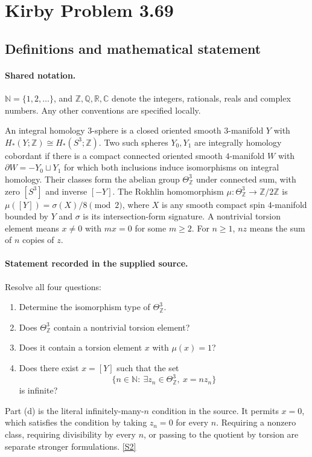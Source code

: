 \documentclass[11pt]{article}
\newcommand{\sref}[2]{\hyperlink{source:#1:#2}{[S#2]}}
\begin{document}
\section{Kirby Problem 3.69}\label{statement}

\subsection{Definitions and mathematical statement}

\paragraph{Shared notation.}$\mathbb N=\{1,2,\ldots\}$, and $\mathbb Z,\mathbb Q,\mathbb R,\mathbb C$ denote the integers, rationals, reals and complex numbers. Any other conventions are specified locally.


An integral homology $3$-sphere is a closed oriented smooth $3$-manifold $Y$ with $H_*(Y;\mathbb Z)\cong H_*(S^3;\mathbb Z)$. Two such spheres $Y_0,Y_1$ are integrally homology cobordant if there is a compact connected oriented smooth $4$-manifold $W$ with $\partial W=-Y_0\sqcup Y_1$ for which both inclusions induce isomorphisms on integral homology. Their classes form the abelian group $\Theta^3_{\mathbb Z}$ under connected sum, with zero $[S^3]$ and inverse $[-Y]$.
The Rokhlin homomorphism $\mu:\Theta^3_{\mathbb Z}\to\mathbb Z/2\mathbb Z$ is $\mu([Y])=\sigma(X)/8\pmod2$, where $X$ is any smooth compact spin $4$-manifold bounded by $Y$ and $\sigma$ is its intersection-form signature. A nontrivial torsion element means $x\ne0$ with $mx=0$ for some $m\ge2$. For $n\ge1$, $nz$ means the sum of $n$ copies of $z$.
\paragraph{Statement recorded in the supplied source.}
Resolve all four questions:
\begin{enumerate}
\item Determine the isomorphism type of $\Theta^3_{\mathbb Z}$.
\item Does $\Theta^3_{\mathbb Z}$ contain a nontrivial torsion element?
\item Does it contain a torsion element $x$ with $\mu(x)=1$?
\item Does there exist $x=[Y]$ such that the set
\[
\{n\in\mathbb N:\ \exists z_n\in\Theta^3_{\mathbb Z},\ x=nz_n\}
\]
is infinite?
\end{enumerate}
Part (d) is the literal infinitely-many-$n$ condition in the source. It permits $x=0$, which satisfies the condition by taking $z_n=0$ for every $n$. Requiring a nonzero class, requiring divisibility by every $n$, or passing to the quotient by torsion are separate stronger formulations. \sref{statement}{2}
\end{document}

